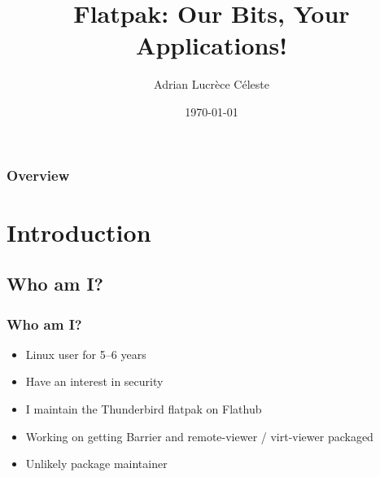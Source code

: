 \documentclass[handout]{beamer}
\title[Our Bits, Your Applications!]{Flatpak: Our Bits, Your Applications!} %
\author{Adrian Lucr\`{e}ce C\'{e}leste} %
\institute[Freelance] %
{
\emph{adrianlucrececeleste@airmail.cc} %
}
\date{\today} %
\begin{document}
\begin{frame}
\titlepage{} %
\end{frame}

\begin{frame}
\frametitle{Overview} %
\tableofcontents %
\end{frame}


\section{Introduction}
\subsection{Who am I?}
\begin{frame}
	\frametitle{Who am I?}
	\begin{itemize}
		\item{Linux user for 5--6 years}
		\item{Have an interest in security}
		\item{I maintain the Thunderbird flatpak on Flathub}
		\item{Working on getting Barrier and remote-viewer / virt-viewer packaged}
		\item{Unlikely package maintainer}
	\end{itemize}
\end{frame}
\end{document}
